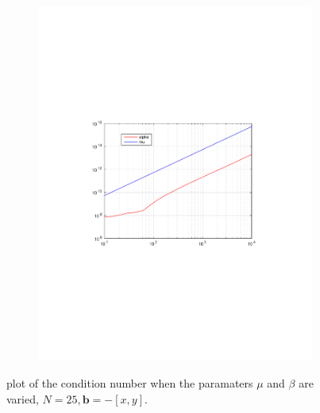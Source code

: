 \begin{figure}[h!]
\begin{subfigure}[b]{0.48\textwidth}
		\includegraphics[width=\textwidth]{Figures/Spec-LS_difftrans_ConditionNumber.pdf}
  \end{subfigure}
  \vspace{-0.1\baselineskip}
	\caption{plot of the condition number when the paramaters $\mu$ and $\beta$ are varied, $N=25,\mathbf{b} = -[x,y]$.}
  \label{fig:CondDifftransSpec}
\end{figure}
%
%
